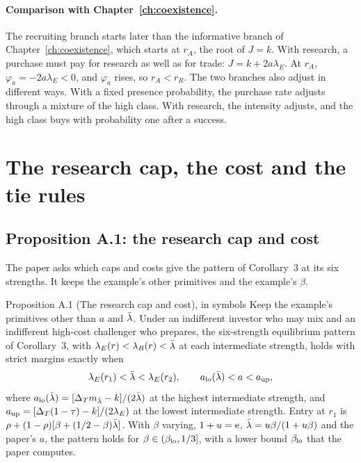 \paragraph{Comparison with Chapter~\ref{ch:coexistence}.} The recruiting branch starts later than the informative
branch of Chapter~\ref{ch:coexistence}, which starts at \(r_A\), the root of \(J=k\). With research, a purchase must pay
for research as well as for trade: \(J=k+2a\lambda_E\). At \(r_A\), \(\varphi_a=-2a\lambda_E<0\), and \(\varphi_a\) rises,
so \(r_A<r_R\). The two branches also adjust in different ways. With a fixed presence probability, the purchase rate
adjusts through a mixture of the high class. With research, the intensity adjusts, and the high class buys with
probability one after a success.

\section{The research cap, the cost and the tie rules}\label{sec:research-ties}

\subsection{Proposition A.1: the research cap and cost}

The paper asks which caps and costs give the pattern of Corollary~3 at its six strengths. It keeps the example's other
primitives and the example's \(\beta\).

\begin{paperresult}{Proposition A.1 (The research cap and cost), in symbols}
Keep the example's primitives other than \(a\) and \(\bar\lambda\). Under an indifferent investor who may mix and an
indifferent high-cost challenger who prepares, the six-strength equilibrium pattern of Corollary~3, with
\(\lambda_E(r)<\lambda_R(r)<\bar\lambda\) at each intermediate strength, holds with strict margins exactly when
\[
\lambda_E(r_1)<\bar\lambda<\lambda_E(r_2),\qquad a_{\rm lo}(\bar\lambda)<a<a_{\rm up},
\]
where \(a_{\rm lo}(\bar\lambda)=[\Delta_T m_{\bar\lambda}-k]/(2\bar\lambda)\) at the highest intermediate strength, and
\(a_{\rm up}=[\Delta_T(1-\tau)-k]/(2\lambda_E)\) at the lowest intermediate strength. Entry at \(r_1\) is
\(\rho+(1-\rho)[\beta+(1/2-\beta)\bar\lambda]\). With \(\beta\) varying, \(1+u=\mathrm{e}\), \(\bar\lambda=u\beta/(1+u\beta)\) and the paper's
\(a\), the pattern holds for \(\beta\in(\beta_{\rm lo},1/3]\), with a lower bound \(\beta_{\rm lo}\) that the paper
computes.
\end{paperresult}

